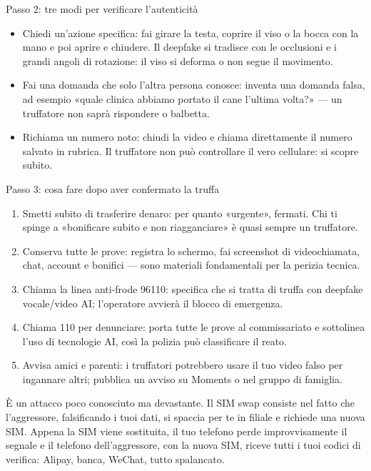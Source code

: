 \begin{tcbinfo}{Passo 2: tre modi per verificare l'autenticità}
\begin{itemize}
  \item Chiedi un'azione specifica: fai girare la testa, coprire il viso o la bocca con la mano e poi aprire e chiudere. Il deepfake si tradisce con le occlusioni e i grandi angoli di rotazione: il viso si deforma o non segue il movimento.
  \item Fai una domanda che solo l'altra persona conosce: inventa una domanda falsa, ad esempio «quale clinica abbiamo portato il cane l'ultima volta?» — un truffatore non saprà rispondere o balbetta.
  \item Richiama un numero noto: chiudi la video e chiama direttamente il numero salvato in rubrica. Il truffatore non può controllare il vero cellulare: si scopre subito.
\end{itemize}

\end{tcbinfo}

\begin{tcbwarn}{Passo 3: cosa fare dopo aver confermato la truffa}
\begin{enumerate}
  \item Smetti subito di trasferire denaro: per quanto «urgente», fermati. Chi ti spinge a «bonificare subito e non riagganciare» è quasi sempre un truffatore.
  \item Conserva tutte le prove: registra lo schermo, fai screenshot di videochiamata, chat, account e bonifici — sono materiali fondamentali per la perizia tecnica.
  \item Chiama la linea anti-frode 96110: specifica che si tratta di truffa con deepfake vocale/video AI; l'operatore avvierà il blocco di emergenza.
  \item Chiama 110 per denunciare: porta tutte le prove al commissariato e sottolinea l'uso di tecnologie AI, così la polizia può classificare il reato.
  \item Avvisa amici e parenti: i truffatori potrebbero usare il tuo video falso per ingannare altri; pubblica un avviso su Moments o nel gruppo di famiglia.
\end{enumerate}

\end{tcbwarn}


È un attacco poco conosciuto ma devastante. Il SIM swap consiste nel fatto che l'aggressore, falsificando i tuoi dati, si spaccia per te in filiale e richiede una nuova SIM. Appena la SIM viene sostituita, il tuo telefono perde improvvisamente il segnale e il telefono dell'aggressore, con la nuova SIM, riceve tutti i tuoi codici di verifica: Alipay, banca, WeChat, tutto spalancato.

